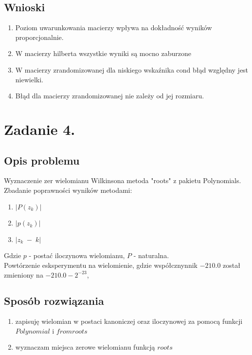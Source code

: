 \documentclass[12pt]{article}
\begin{document}
\subsection{Wnioski}
\begin{enumerate}
  \item Poziom uwarunkowania macierzy wpływa na dokładność wyników proporcjonalnie.
  \item W macierzy hilberta wszystkie wyniki są mocno zaburzone
  \item W macierzy zrandomizowanej dla niskiego wskaźnika cond błąd względny jest niewielki.
  \item Błąd dla macierzy zrandomizowanej nie zależy od jej rozmiaru.
\end{enumerate}

\section{Zadanie 4.}

\subsection{Opis problemu}
Wyznaczenie zer wielomianu Wilkinsona metoda "roots" z 
pakietu Polynomials.
Zbadanie poprawności wyników metodami:
\begin{enumerate}
  \item $|P(z_{k})|$
  \item $|p(z_{k})|$
  \item $|z_{k}\;-\;k|$
\end{enumerate}
Gdzie $p$ - postać iloczynowa wielomianu, $P$ - naturalna.
\\Powtórzenie esksperymentu na wielomienie, gdzie współcznynnik $-210.0$ został zmieniony na $-210.0-2^{-23}$,
\subsection{Sposób rozwiązania}
\begin{enumerate}
  \item zapisuję wielomian w postaci kanoniczej oraz iloczynowej za pomocą funkcji $Polynomial$ i $fromroots$
  \item wyznaczam miejsca zerowe wielomianu funkcją $roots$
\end{enumerate}
\newpage
\end{document}
